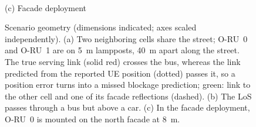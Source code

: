 \documentclass[conference]{IEEEtran}
\begin{document}
\begin{figure}[t]
\begin{minipage}[b]{0.37\textwidth}
\\[0.5mm]
{\footnotesize (c) Facade deployment}
\end{minipage}
\caption{Scenario geometry (dimensions indicated; axes scaled independently). (a) Two neighboring cells share the
street; O-RU~0 and O-RU~1 are on \SI{5}{m} lampposts, \SI{40}{m} apart
along the street. The
true serving link (solid red) crosses the bus, whereas the link predicted
from the reported UE position (dotted) passes it, so a position error
turns into a missed blockage prediction; green: link to the other cell
and one of its facade reflections (dashed). (b) The LoS passes through a
bus but above a car. (c) In the facade deployment, O-RU~0 is mounted on
the north facade at \SI{8}{m}.}
\label{fig:scenario}
\end{figure}
\end{document}
